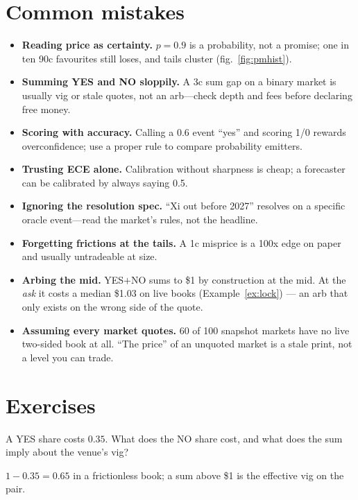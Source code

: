 \section{Common mistakes}
\begin{itemize}
\item \textbf{Reading price as certainty.} $p=0.9$ is a probability, not a promise; one in ten
  90c favourites still loses, and tails cluster (fig.\ \ref{fig:pmhist}).
\item \textbf{Summing YES and NO sloppily.} A 3c sum gap on a binary market is usually vig or
  stale quotes, not an arb---check depth and fees before declaring free money.
\item \textbf{Scoring with accuracy.} Calling a 0.6 event ``yes'' and scoring 1/0 rewards
  overconfidence; use a proper rule to compare probability emitters.
\item \textbf{Trusting ECE alone.} Calibration without sharpness is cheap; a forecaster can
  be calibrated by always saying 0.5.
\item \textbf{Ignoring the resolution spec.} ``Xi out before 2027'' resolves on a specific
  oracle event---read the market's rules, not the headline.
\item \textbf{Forgetting frictions at the tails.} A 1c misprice is a 100x edge on paper and
  usually untradeable at size.
\item \textbf{Arbing the mid.} YES$+$NO sums to \$1 by
construction at the mid. At the \emph{ask} it costs a median
\$1.03 on live books (Example~\ref{ex:lock}) --- an arb that only
exists on the wrong side of the quote.
\item \textbf{Assuming every market quotes.} 60 of 100 snapshot
markets have no live two-sided book at all. ``The price'' of an
unquoted market is a stale print, not a level you can trade.
\end{itemize}

\section{Exercises}
\begin{exercise}[easy]
A YES share costs $0.35$. What does the NO share cost, and what does the sum imply about
the venue's vig?
\end{exercise}
\begin{solution}
$1-0.35=0.65$ in a frictionless book; a sum above \$1 is the effective vig on the pair.
\end{solution}

